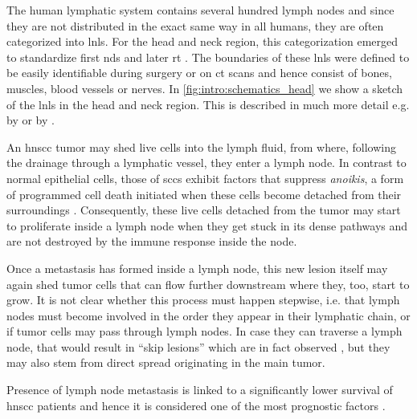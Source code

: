 \documentclass[\relativeRoot/main.tex]{subfiles}
\begin{document}
The human lymphatic system contains several hundred lymph nodes \cite{willard-mack_normal_2006} and since they are not distributed in the exact same way in all humans, they are often categorized into \glspl{lnl}. For the head and neck region, this categorization emerged to standardize first \glspl{nd} \cite{robbins_standardizing_1991} and later \gls{rt} \cite{gregoire_ct-based_2003}. The boundaries of these \glspl{lnl} were defined to be easily identifiable during surgery or on \gls{ct} scans and hence consist of bones, muscles, blood vessels or nerves. In \cref{fig:intro:schematics_head} we show a sketch of the \glspl{lnl} in the head and neck region. This is described in much more detail e.g. by  or by .

An \gls{hnscc} tumor may shed live cells into the lymph fluid, from where, following the drainage through a lymphatic vessel, they enter a lymph node. In contrast to normal epithelial cells, those of \glspl{scc} exhibit factors that suppress \emph{anoikis}, a form of programmed cell death initiated when these cells become detached from their surroundings \cite{peltanova_effect_2019}. Consequently, these live cells detached from the tumor may start to proliferate inside a lymph node when they get stuck in its dense pathways and are not destroyed by the immune response inside the node.

Once a metastasis has formed inside a lymph node, this new lesion itself may again shed tumor cells that can flow further downstream where they, too, start to grow. It is not clear whether this process must happen stepwise, i.e. that lymph nodes must become involved in the order they appear in their lymphatic chain, or if tumor cells may pass through lymph nodes. In case they can traverse a lymph node, that would result in ``skip lesions'' which are in fact observed \cite{woolgar_topography_2007}, but they may also stem from direct spread originating in the main tumor.

Presence of lymph node metastasis is linked to a significantly lower survival of \gls{hnscc} patients and hence it is considered one of the most prognostic factors \cite{jones_level_1994,lim_distributions_2006,takes_staging_2004}.
\end{document}
